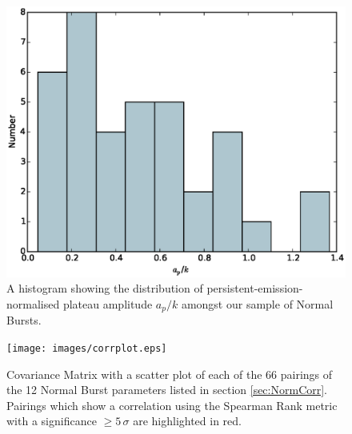 \begin{figure}
  \centering
  \includegraphics[width=.9\linewidth, trim={0cm 0 0cm 0},clip]{images/appendix_plat_pa_n_hist.eps}
  \caption{\small A histogram showing the distribution of persistent-emission-normalised plateau amplitude $a_p/k$ amongst our sample of Normal Bursts.}
  \label{fig:app_hist_ap_n}
\end{figure}
\begin{figure}
  \centering
  \texttt{[image: images/corrplot.eps]}
  \caption{\small Covariance Matrix with a scatter plot of each of the 66 pairings of the 12 Normal Burst parameters listed in section \ref{sec:NormCorr}.  Pairings which show a correlation using the Spearman Rank metric with a significance $\geq5\,\sigma$ are highlighted in red.}
  \label{fig:corr}
\end{figure}

